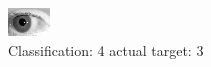 \begin{figure}[h!]
\begin{center}
\includegraphics[width=0.60\columnwidth]{figures/ID220_class_4_target_3.png}
\end{center}
\caption{ Classification: 4 actual target: 3}
\label{fig:ID220_class_4_target_3}
\end{figure}
